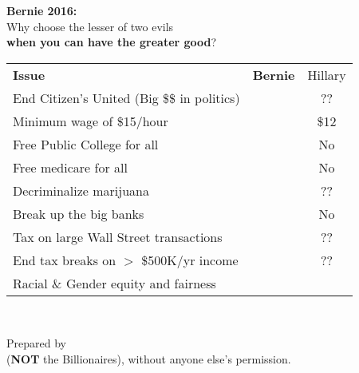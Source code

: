 \newcommand{\checkbox}{\makebox[0pt][l]{$\square$}\raisebox{.15ex}{\hspace{0.1em}$\checkmark$}}

\vspace{-12pt}

\begin{center}
  {\Huge\bf Bernie 2016:}\\

  {\small Why choose the lesser of two evils  \\
    {\bf when you can have the greater good}?}\\

  \begin{tabular}{l|c|c}
    {\bf Issue} & {\bf Bernie} & Hillary \\[2pt]
End Citizen's United (Big \$\$ in politics)  & \checkbox &	??	\\
Minimum wage of \$15/hour                    & \checkbox &	\$12	\\
Free Public College for all                  & \checkbox &	No	\\
Free medicare for all                        & \checkbox &	No	\\
Decriminalize marijuana                      & \checkbox &	??	\\
Break up the big banks                       & \checkbox &	No	\\
Tax on large Wall Street transactions        & \checkbox &	??	\\
End tax breaks on $>$ \$500K/yr income       & \checkbox &	??	\\
Racial \& Gender equity and fairness         & \checkbox & \checkbox    \\
\hline
  \end{tabular}
\\[5pt]
\begin{framed}
\small Prepared by \GroupName\\
({\bf NOT} the Billionaires), without anyone else's permission.\\
{\tt \GroupURL}\\
\end{framed}
\end{center}	
